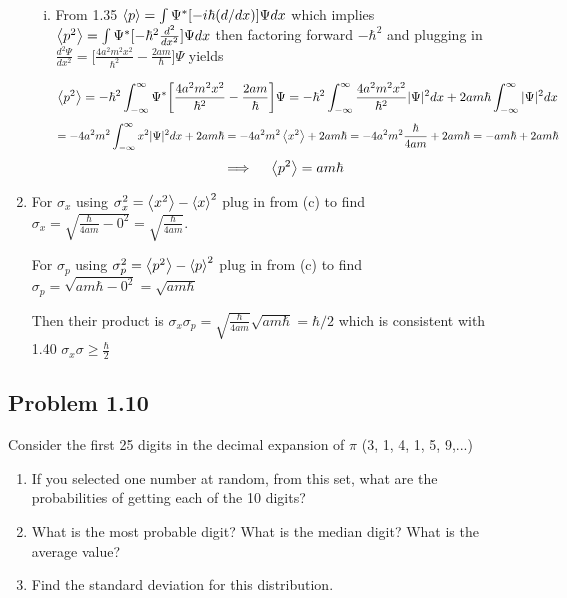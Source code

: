 \documentclass[12pt]{exam}
\begin{document}
\begin{solution}
\begin{enumerate}
\begin{enumerate}[(i)]
            \item From 1.35 $\expval{p} = \int \Psi^* [-i\hbar (d/dx)]\Psi dx$ which implies $\expval{p^2} = \int \Psi^* [-\hbar^2 \frac{d^2}{dx^2}] \Psi dx$ then factoring forward $-\hbar^2$ and plugging in $\frac{d^2\Psi}{dx^2} = \big[ \frac{4a^2m^2x^2}{\hbar^2} -\frac{2am}{\hbar}\big]\Psi$ yields 
            
            $$\expval{p^2} = -\hbar^2\int^\infty_{-\infty} \Psi^*\bigg[ \frac{4a^2m^2x^2}{\hbar^2} -\frac{2am}{\hbar}\bigg]\Psi = -\hbar^2\int^\infty_{-\infty} \frac{4a^2m^2x^2}{\hbar^2}|\Psi|^2 dx+2am\hbar \int^\infty_{-\infty} |\Psi|^2dx$$
            $$
            = -4a^2m^2\int^\infty_{-\infty} x^2|\Psi|^2 dx +2am\hbar = -4a^2m^2\expval{x^2} +2am\hbar = -4a^2m^2\frac{\hbar}{4am} +2am\hbar = -am\hbar +2am\hbar$$
            $$\implies \quad \expval{p^2} = am\hbar$$
        \end{enumerate}

        \item For $\sigma_x$ using $\sigma_x^2 =\expval{x^2}-\expval{x}^2$ plug in from (c) to find $\sigma_x = \sqrt{\frac{\hbar}{4am}- 0^2} = \sqrt{\frac{\hbar}{4am}}$.

        For $\sigma_p$ using $\sigma_p^2 = \expval{p^2}-\expval{p}^2$ plug in from (c) to find $\sigma_p = \sqrt{am\hbar -0^2} = \sqrt{am\hbar}$

        Then their product is $\sigma_x\sigma
        _p = \sqrt{\frac{\hbar}{4am}}\sqrt{am\hbar} = \hbar/2$ which is consistent with 1.40 $\sigma_x\sigma \geq \frac{\hbar}{2}$
    \end{enumerate}
\end{solution}





\subsection*{Problem 1.10}
Consider the first 25 digits in the decimal expansion of $\pi$ (3, 1, 4, 1, 5, 9,...)
\begin{enumerate}
    \item If you selected one number at random, from this set, what are the probabilities of getting each of the 10 digits?

    \item What is the most probable digit? What is the median digit? What is the average value? 

    \item Find the standard deviation for this distribution.
\end{enumerate}
\end{document}
